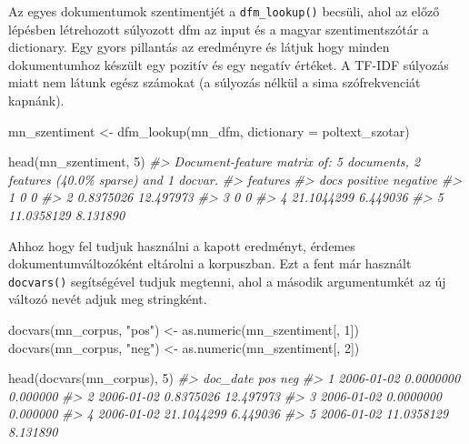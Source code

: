 \documentclass[
]{book}
\newenvironment{Shaded}{\begin{snugshade}}{\end{snugshade}}
\newcommand{\AttributeTok}[1]{\textcolor[rgb]{0.77,0.63,0.00}{#1}}
\newcommand{\CommentTok}[1]{\textcolor[rgb]{0.56,0.35,0.01}{\textit{#1}}}
\newcommand{\DecValTok}[1]{\textcolor[rgb]{0.00,0.00,0.81}{#1}}
\newcommand{\FunctionTok}[1]{\textcolor[rgb]{0.00,0.00,0.00}{#1}}
\newcommand{\NormalTok}[1]{#1}
\newcommand{\OtherTok}[1]{\textcolor[rgb]{0.56,0.35,0.01}{#1}}
\newcommand{\StringTok}[1]{\textcolor[rgb]{0.31,0.60,0.02}{#1}}
\begin{document}
Az egyes dokumentumok szentimentjét a \texttt{dfm\_lookup()} becsüli,
ahol az előző lépésben létrehozott súlyozott dfm az input és a magyar
szentimentszótár a dictionary. Egy gyors pillantás az eredményre és
látjuk hogy minden dokumentumhoz készült egy pozitív és egy negatív
értéket. A TF-IDF súlyozás miatt nem látunk egész számokat (a súlyozás
nélkül a sima szófrekvenciát kapnánk).

\begin{Shaded}
\begin{Highlighting}[]
\NormalTok{mn\_szentiment }\OtherTok{\textless{}{-}} \FunctionTok{dfm\_lookup}\NormalTok{(mn\_dfm, }\AttributeTok{dictionary =}\NormalTok{ poltext\_szotar)}

\FunctionTok{head}\NormalTok{(mn\_szentiment, }\DecValTok{5}\NormalTok{)}
\CommentTok{\#\textgreater{} Document{-}feature matrix of: 5 documents, 2 features (40.0\% sparse) and 1 docvar.}
\CommentTok{\#\textgreater{}     features}
\CommentTok{\#\textgreater{} docs   positive  negative}
\CommentTok{\#\textgreater{}    1  0          0       }
\CommentTok{\#\textgreater{}    2  0.8375026 12.497973}
\CommentTok{\#\textgreater{}    3  0          0       }
\CommentTok{\#\textgreater{}    4 21.1044299  6.449036}
\CommentTok{\#\textgreater{}    5 11.0358129  8.131890}
\end{Highlighting}
\end{Shaded}

Ahhoz hogy fel tudjuk használni a kapott eredményt, érdemes
dokumentumváltozóként eltárolni a korpuszban. Ezt a fent már használt
\texttt{docvars()} segítségével tudjuk megtenni, ahol a második
argumentumkét az új változó nevét adjuk meg stringként.

\begin{Shaded}
\begin{Highlighting}[]

\FunctionTok{docvars}\NormalTok{(mn\_corpus, }\StringTok{"pos"}\NormalTok{) }\OtherTok{\textless{}{-}} \FunctionTok{as.numeric}\NormalTok{(mn\_szentiment[, }\DecValTok{1}\NormalTok{])}
\FunctionTok{docvars}\NormalTok{(mn\_corpus, }\StringTok{"neg"}\NormalTok{) }\OtherTok{\textless{}{-}} \FunctionTok{as.numeric}\NormalTok{(mn\_szentiment[, }\DecValTok{2}\NormalTok{])}

\FunctionTok{head}\NormalTok{(}\FunctionTok{docvars}\NormalTok{(mn\_corpus), }\DecValTok{5}\NormalTok{)}
\CommentTok{\#\textgreater{}     doc\_date        pos       neg}
\CommentTok{\#\textgreater{} 1 2006{-}01{-}02  0.0000000  0.000000}
\CommentTok{\#\textgreater{} 2 2006{-}01{-}02  0.8375026 12.497973}
\CommentTok{\#\textgreater{} 3 2006{-}01{-}02  0.0000000  0.000000}
\CommentTok{\#\textgreater{} 4 2006{-}01{-}02 21.1044299  6.449036}
\CommentTok{\#\textgreater{} 5 2006{-}01{-}02 11.0358129  8.131890}
\end{Highlighting}
\end{Shaded}
\end{document}
